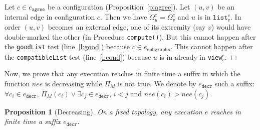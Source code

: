 \documentclass[11pt,english]{article}
\newtheorem{proposition}{Proposition}
\newenvironment{proof}[1][0cm]{
  \begin{list}{\bf Proof.~}{
      \setlength{\itemindent}{0cm}
      \setlength{\labelsep}{0cm}
      \setlength{\labelwidth}{#1}
      \setlength{\leftmargin}{#1}
    \item
    }
}{\hfill$\Box$
  \end{list}
}
\begin{document}
\begin{proof}
  Let $c \in e_\texttt{agree}$ be a configuration (Proposition~\ref{p:agree}).
  Let $(u,v)$ be an internal edge in configuration $c$. Then we have $\Omega_u^c
  = \Omega_v^c$ and $u$ is in $\texttt{list}_v^c$.
In order $(u,v)$ becomes an external edge, one of its extremity (say $v$)
  would have double-marked the other (in Procedure \texttt{compute()}). But this
  cannot happen after the \texttt{goodList} test (line~\ref{l:good}) because $c
  \in e_\texttt{subgraphs}$. This cannot happen after the \texttt{compatibleList}
  test (line~\ref{l:cond}) because $u$ is in already in \texttt{view}$_v^c$.
\end{proof}

Now, we prove that any execution reaches in finite time a suffix in which the
function $nee$ is decreasing while $\Pi_M$ is not true. We denote by
$e_\texttt{decr}$ such a suffix: $\forall c_i \in e_\texttt{decr}$, $\Pi_M(c_i)
\vee \exists c_j \in e_\texttt{decr}$, $i < j$ and $nee(c_i) > nee(c_j)$.

 \begin{proposition}[Decreasing]\label{p:decr}
 On a fixed topology, any execution $e$ reaches in finite time a suffix $e_\texttt{decr}$.
 \end{proposition}
\end{document}

